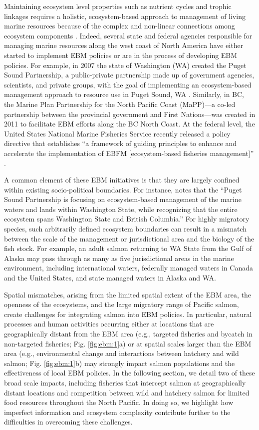 Maintaining ecosystem level properties such as nutrient cycles and trophic
linkages requires a holistic, ecosystem-based approach to management of living
marine resources because of the complex and non-linear connections among
ecosystem components \citep{Engler2015}. Indeed, several state and federal
agencies responsible for managing marine resources along the west coast of North
America have either started to implement EBM policies or are in the process of
developing EBM policies. For example, in 2007 the state of Washington (WA)
created the Puget Sound Partnership, a public-private partnership made up of
government agencies, scientists, and private groups, with the goal of
implementing an ecosystem-based management approach to resource use in Puget
Sound, WA \citep{Ruckelshaus2009, Samhouri2011a}. Similarly, in BC, the Marine
Plan Partnership for the North Pacific Coast (MaPP)---a co-led partnership
between the provincial government and First Nations---was created in 2011 to
facilitate EBM efforts along the BC North Coast. At the federal level, the
United States National Marine Fisheries Service recently released a policy
directive that establishes ``a framework of guiding principles to enhance and
accelerate the implementation of EBFM {[}ecosystem-based fisheries
management{]}'' \citep{NMFS2016}.

A common element of these EBM initiatives is that they are largely confined
within existing socio-political boundaries. For instance,
\citet{Ruckelshaus2009} notes that the ``Puget Sound Partnership is focusing on
ecosystem-based management of the marine waters and lands within Washington
State, while recognizing that the entire ecosystem spans Washington State and
British Columbia.'' For highly migratory species, such arbitrarily defined
ecosystem boundaries can result in a mismatch between the scale of the
management or jurisdictional area and the biology of the fish stock. For
example, an adult salmon returning to WA State from the Gulf of Alaska may pass
through as many as five jurisdictional areas in the marine environment,
including international waters, federally managed waters in Canada and the
United States, and state managed waters in Alaska and WA.

Spatial mismatches, arising from the limited spatial extent of the EBM area, the
openness of the ecosystems, and the large migratory range of Pacific salmon,
create challenges for integrating salmon into EBM policies. In particular,
natural processes and human activities occurring either at locations that are
geographically distant from the EBM area (e.g., targeted fisheries and bycatch
in non-targeted fisheries; Fig. \ref{fig:ebm:1}a) or at spatial scales larger than
the EBM area (e.g., environmental change and interactions between hatchery and
wild salmon; Fig. \ref{fig:ebm:1}b) may strongly impact salmon populations and
the effectiveness of local EBM policies. In the following section, we detail two
of these broad scale impacts, including fisheries that intercept salmon at
geographically distant locations and competition between wild and hatchery
salmon for limited food resources throughout the North Pacific. In doing so, we
highlight how imperfect information and ecosystem complexity contribute further
to the difficulties in overcoming these challenges.

